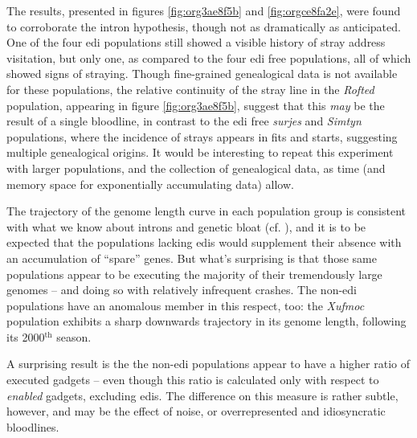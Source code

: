\documentclass[12pt,glossary]{dalthesis}
\begin{document}
The results, presented in figures \ref{fig:org3ae8f5b} and
\ref{fig:orgce8fa2e}, were found to corroborate the intron hypothesis,
though not as dramatically as anticipated. One of the four \gls{edi} populations
still showed a visible history of stray address visitation, but only one, as
compared to the four \gls{edi} free populations, all of which showed signs of
straying. Though fine-grained genealogical data is not available for these
populations, the relative continuity of the stray line in the \emph{Rofted} population, 
appearing in figure \ref{fig:org3ae8f5b}, suggest that this \emph{may} be the
result of a single bloodline, in contrast to the \gls{edi} free \emph{surjes} and 
\emph{Simtyn} populations, where the incidence of strays appears in fits and starts, 
suggesting multiple genealogical origins. It would be interesting to repeat this
experiment with larger populations, and the collection of genealogical data, 
as time (and memory space for exponentially accumulating data) allow. 

The trajectory of the genome length curve in each population group is consistent
with what we know about introns and genetic bloat (cf. \cite{banzhaf98}), and
it is to be expected that the populations lacking \glspl{edi} would supplement
their absence with an accumulation of ``spare'' genes. But what's surprising is
that those same populations appear to be executing the majority of their
tremendously large genomes -- and doing so with relatively infrequent crashes. 
The non-\gls{edi} populations have an anomalous member in this respect, too:
the \emph{Xufmoc} population exhibits a sharp downwards trajectory in its genome
length, following its 2000\(^{\text{th}}\) season.  

A surprising result is the the non-\gls{edi} populations appear to have a higher
ratio of executed gadgets -- even though this ratio is calculated only with respect
to \emph{enabled} gadgets, excluding \glspl{edi}. The difference on this measure is rather
subtle, however, and may be the effect of noise, or overrepresented and idiosyncratic
bloodlines. 
\end{document}
